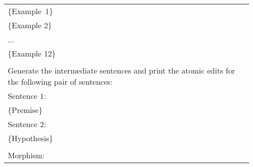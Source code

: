 \begin{tabular}{p{16cm}}
\{Example\ 1\}\\
\{Example 2\}\\
... \\
\{Example 12\}\\ \\
Generate the intermediate sentences and print the atomic edits for the following pair of sentences:\\

Sentence 1:\\
\{Premise\}\\

Sentence 2:\\
\{Hypothesis\}\\ \\

Morphism:\\
\hline
\end{tabular}